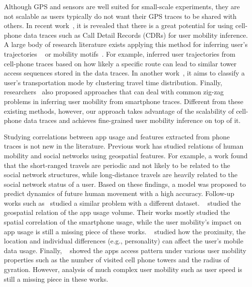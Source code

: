Although GPS and sensors are well suited for small-scale experiments, they are not scalable as users typically do not want their GPS traces to be shared with others. In recent work~\cite{rose2006mobile},  it is revealed that there is a great potential for using cell-phone data traces such as Call Detail Records (CDRs) for user mobility inference. A large body of research literature exists applying this method for inferring user's trajectories ~\cite{smoreda2013spatiotemporal, hoteit2014estimating, widhalm2015discovering, Alsolami2012Auth, jiang2013review, bekhor2015investigation, leontiadis2014cells} or mobility motifs~\cite{wang2014mobile, gambs2012next}. For example, \cite{Alsolami2012Auth, jiang2013review} inferred user trajectories from cell-phone traces based on how likely a specific route can lead to similar tower access sequences stored in the data traces. In another work~\cite{wang2010transportation}, it aims to classify a user's transportation mode by clustering travel time distribution. Finally, researchers~\cite{bekhor2015investigation} also proposed approaches that can deal with common zig-zag problems in inferring user mobility from smartphone traces.
Different from these existing methods, however, our approach takes advantage of the scalability of cell-phone data traces and achieves fine-grained user mobility inference on top of it.


Studying correlations between app usage and features extracted from phone traces is not new in the literature. Previous work has studied relations of human mobility and social networks using geospatial features. For example, a work \cite{cho2011friendship} found that the short-ranged travels are periodic and not likely to be related to the social network structures, while long-distance travels are heavily related to the social network status of a user. Based on these findings, a model was proposed to predict dynamics of future human movement with a high accuracy. Follow-up works such as~\cite{Noulas11} studied a similar problem with a different dataset. ~\cite{shafiq2012characterizing,yang2015characterizing} studied the geospatial relation of the app usage volume. Their works mostly studied the spatial correlation of the smartphone usage, while the user mobility's impact on app usage is still a missing piece of these works. ~\cite{meng2014analyzing} studied how the proximity, the location and individual differences (e.g., personality) can affect the user's mobile data usage. Finally, ~\cite{yang2016apps} showed the apps access pattern under various user mobility properties such as the number of visited cell phone towers and the radius of gyration. However, analysis of much complex user mobility such as user speed is still a missing piece in these works. 


